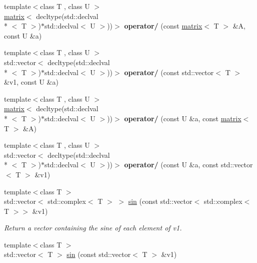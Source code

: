 \begin{DoxyCompactItemize}
\item 
\hypertarget{namespacekeycpp_a3852c35cfcc8caa784465a26d04c68a1}{{\footnotesize template$<$class T , class U $>$ }\\\hyperlink{classkeycpp_1_1matrix}{matrix}$<$ decltype(std\-::declval\\*
$<$ T $>$)$\ast$std\-::declval$<$ U $>$))$>$ {\bfseries operator/} (const \hyperlink{classkeycpp_1_1matrix}{matrix}$<$ T $>$ \&A, const U \&a)}\label{namespacekeycpp_a3852c35cfcc8caa784465a26d04c68a1}

\item 
\hypertarget{namespacekeycpp_a394f23f09cf122a8e8c20a7afd40f58e}{{\footnotesize template$<$class T , class U $>$ }\\std\-::vector$<$ decltype(std\-::declval\\*
$<$ T $>$)$\ast$std\-::declval$<$ U $>$))$>$ {\bfseries operator/} (const std\-::vector$<$ T $>$ \&v1, const U \&a)}\label{namespacekeycpp_a394f23f09cf122a8e8c20a7afd40f58e}

\item 
\hypertarget{namespacekeycpp_aafc0089bdf204385c1e627755c5070b0}{{\footnotesize template$<$class T , class U $>$ }\\\hyperlink{classkeycpp_1_1matrix}{matrix}$<$ decltype(std\-::declval\\*
$<$ T $>$)$\ast$std\-::declval$<$ U $>$))$>$ {\bfseries operator/} (const U \&a, const \hyperlink{classkeycpp_1_1matrix}{matrix}$<$ T $>$ \&A)}\label{namespacekeycpp_aafc0089bdf204385c1e627755c5070b0}

\item 
\hypertarget{namespacekeycpp_a4d18510a87d417d5c38f24ded26a8cee}{{\footnotesize template$<$class T , class U $>$ }\\std\-::vector$<$ decltype(std\-::declval\\*
$<$ T $>$)$\ast$std\-::declval$<$ U $>$))$>$ {\bfseries operator/} (const U \&a, const std\-::vector$<$ T $>$ \&v1)}\label{namespacekeycpp_a4d18510a87d417d5c38f24ded26a8cee}

\item 
\hypertarget{namespacekeycpp_a60d3f3c9d269e14b23609d754684cdcf}{{\footnotesize template$<$class T $>$ }\\std\-::vector$<$ std\-::complex$<$ T $>$ $>$ \hyperlink{namespacekeycpp_a60d3f3c9d269e14b23609d754684cdcf}{sin} (const std\-::vector$<$ std\-::complex$<$ T $>$$>$ \&v1)}\label{namespacekeycpp_a60d3f3c9d269e14b23609d754684cdcf}

\begin{DoxyCompactList}\small\item\em Return a vector containing the sine of each element of v1. \end{DoxyCompactList}\item 
\hypertarget{namespacekeycpp_a56636d37802b9237f0e09690307cacef}{{\footnotesize template$<$class T $>$ }\\std\-::vector$<$ T $>$ \hyperlink{namespacekeycpp_a56636d37802b9237f0e09690307cacef}{sin} (const std\-::vector$<$ T $>$ \&v1)}\label{namespacekeycpp_a56636d37802b9237f0e09690307cacef}


\end{DoxyCompactItemize}

